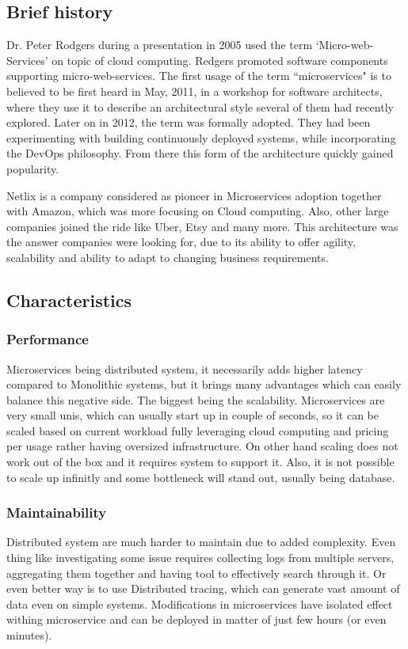 \subsection{Brief history}
Dr. Peter Rodgers during a presentation in 2005 used the term `Micro-web-Services' on topic of cloud computing. Redgers promoted software components supporting micro-web-services. The first usage of the term ``microservices" is to believed to be first heard in May, 2011, in a workshop for software architects, where they use it to describe an architectural style several of them had recently explored. Later on in 2012, the term was formally adopted. They had been experimenting with building continuously deployed systems, while incorporating the DevOps philosophy. From there this form of the architecture quickly gained popularity. \cite{BRIEF_HISTORY_OF_MS}

Netlix is a company considered as pioneer in Microservices adoption together with Amazon, which was more focusing on Cloud computing. Also, other large companies joined the ride like Uber, Etsy and many more. This architecture was the answer companies were looking for, due to its ability to offer agility, scalability and ability to adapt to changing business requirements. \cite{MS_COMPANIES}



\subsection{Characteristics}
\subsubsection{Performance}
\label{section:microservices:performance}
Microservices being distributed system, it necessarily adds higher latency compared to Monolithic systems, but it brings many advantages which can easily balance this negative side. The biggest being the scalability. Microservices are very small unis, which can usually start up in couple of seconds, so it can be scaled based on current workload fully leveraging cloud computing and pricing per usage rather having oversized infrastructure. On other hand scaling does not work out of the box and it requires system to support it. Also, it is not possible to scale up infinitly and some bottleneck will stand out, usually being database.


\subsubsection{Maintainability}
Distributed system are much harder to maintain due to added complexity. Even thing like investigating some issue requires collecting logs from multiple servers, aggregating them together and having tool to effectively search through it. Or even better way is to use Distributed tracing, which can generate vast amount of data even on simple systems. Modifications in microservices have isolated effect withing microservice and can be deployed in matter of just few hours (or even minutes).

